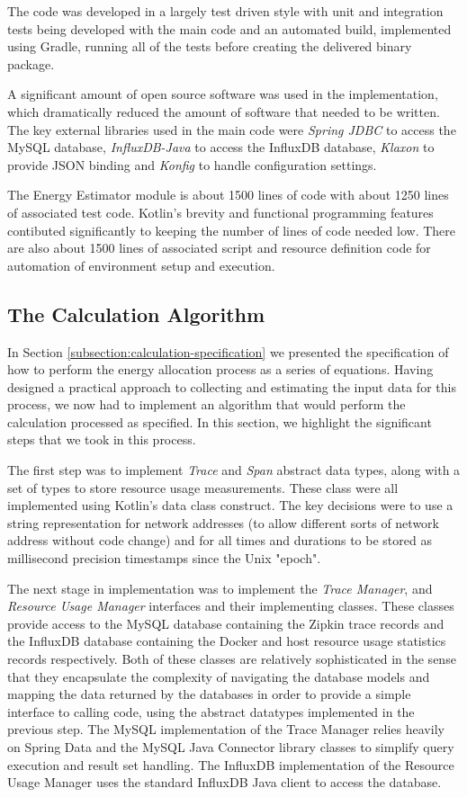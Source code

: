 The code was developed in a largely test driven style with unit and integration tests being developed with the main code and an automated build, implemented using Gradle, running all of the tests before creating the delivered binary package.

A significant amount of open source software was used in the implementation, which dramatically reduced the amount of software that needed to be written.  The key external libraries used in the main code were \emph{Spring JDBC} to access the MySQL database, \emph{InfluxDB-Java} to access the InfluxDB database, \emph{Klaxon} to provide JSON binding and \emph{Konfig} to handle configuration settings. 

The Energy Estimator module is about 1500 lines of code with about 1250 lines of associated test code.  Kotlin's brevity and functional programming features contibuted significantly to keeping the number of lines of code needed low.  There are also about 1500 lines of associated script and resource definition code for automation of environment setup and execution.

\subsection{The Calculation Algorithm}
\label{subsection:algorithm}

In Section \ref{subsection:calculation-specification} we presented the specification of how to perform the energy allocation process as a series of equations.  Having designed a practical approach to collecting and estimating the input data for this process, we now had to implement an algorithm that would perform the calculation processed as specified.  In this section, we highlight the significant steps that we took in this process.

The first step was to implement \emph{Trace} and \emph{Span} abstract data types, along with a set of types to store resource usage measurements.  These class were all implemented using Kotlin's data class construct.  The key decisions were to use a string representation for network addresses (to allow different sorts of network address without code change) and for all times and durations to be stored as millisecond precision timestamps since the Unix "epoch".

The next stage in implementation was to implement the \emph{Trace Manager}, and \emph{Resource Usage Manager} interfaces and their implementing classes.  These classes provide access to the MySQL database containing the Zipkin trace records and the InfluxDB database containing the Docker and host resource usage statistics records respectively.  Both of these classes are relatively sophisticated in the sense that they encapsulate the complexity of navigating the database models and mapping the data returned by the databases in order to provide a simple interface to calling code, using the abstract datatypes implemented in the previous step.  The MySQL implementation of the Trace Manager relies heavily on Spring Data and the MySQL Java Connector library classes to simplify query execution and result set handling.  The InfluxDB implementation of the Resource Usage Manager uses the standard InfluxDB Java client to access the database.


